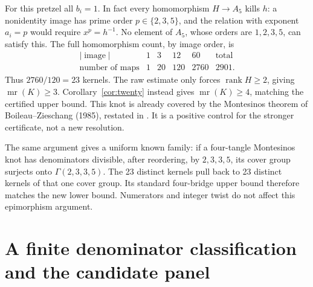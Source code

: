 \documentclass[11pt]{article}
\newcommand{\mr}{\operatorname{mr}}
\newcommand{\rk}{\operatorname{rank}}
\begin{document}
For this pretzel all $b_i=1$. In fact every homomorphism $H\to A_5$
kills $h$: a nonidentity image has prime order $p\in\{2,3,5\}$, and
the relation with exponent $a_i=p$ would require $x^p=h^{-1}$.
No element of $A_5$, whose orders are $1,2,3,5$, can satisfy this.
The full homomorphism count, by image order, is
\[
\begin{array}{c|rrrr|r}
 |\operatorname{image}|&1&3&12&60&\text{total}\\\hline
 \text{number of maps}&1&20&120&2760&2901.
\end{array}
\]
Thus $2760/120=23$ kernels. The raw estimate only forces
$\rk H\ge2$, giving $\mr(K)\ge3$. Corollary~\ref{cor:twenty} instead
gives $\mr(K)\ge4$, matching the certified upper bound. This knot is
already covered by the Montesinos theorem of Boileau--Zieschang
(1985), restated in \cite[Theorem 1]{musick}. It is a positive control
for the stronger certificate, not a new resolution.

The same argument gives a uniform known family: if a four-tangle
Montesinos knot has denominators divisible, after reordering, by
$2,3,3,5$, its cover group surjects onto $\Gamma(2,3,3,5)$.
The 23 distinct kernels pull back to 23 distinct kernels of that one
cover group. Its standard four-bridge upper bound therefore matches
the new lower bound. Numerators and integer twist do not affect this
epimorphism argument.

\section{A finite denominator classification and the candidate panel}
\end{document}
